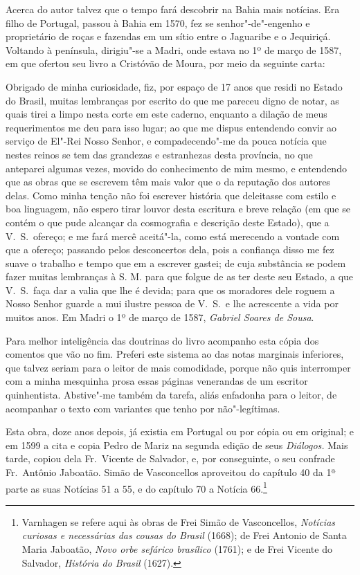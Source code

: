 Acerca do autor talvez que o tempo fará descobrir na Bahia mais 
notícias. Era filho de Portugal, passou à Bahia em 1570, fez 
se senhor"-de"-engenho e proprietário de roças e fazendas em um sítio 
entre o Jaguaribe e o Jequiriçá. Voltando à península, dirigiu"-se a 
Madri, onde estava no 1º de março de 1587, em que ofertou seu livro a 
Cristóvão de Moura, por meio da seguinte carta: 
\begin{hedraquote}
Obrigado de minha curiosidade, fiz, por espaço de 17 anos que 
residi no Estado do Brasil, muitas lembranças por escrito do que me 
pareceu digno de notar, as quais tirei a limpo nesta corte em este 
caderno, enquanto a dilação de meus requerimentos me deu para isso 
lugar; ao que me dispus entendendo convir ao serviço de El"-Rei Nosso 
Senhor, e compadecendo"-me da pouca notícia que nestes reinos se tem 
das grandezas e estranhezas desta província, no que anteparei algumas 
vezes, movido do conhecimento de mim mesmo, e entendendo que as 
obras que se escrevem têm mais valor que o da reputação dos autores 
delas. Como minha tenção não foi escrever história que deleitasse com 
estilo e boa linguagem, não espero tirar louvor desta escritura e breve 
relação (em que se contém o que pude alcançar da cosmografia e 
descrição deste Estado), que a V.~S.~ofereço; e me fará mercê aceitá"-la, 
como está merecendo a vontade com que a ofereço; passando pelos 
desconcertos dela, pois a confiança disso me fez suave o trabalho e 
tempo que em a escrever gastei; de cuja substância se podem fazer 
muitas lembranças à S. M. para que folgue de as ter deste seu Estado, a 
que V.~S.~faça dar a valia que lhe é devida; para que os moradores dele 
roguem a Nosso Senhor guarde a mui ilustre pessoa de V.~S.~e lhe acrescente a 
vida por muitos anos. Em Madri o 1º de março de 1587, \textit{Gabriel Soares de Sousa}. 
\end{hedraquote}

Para melhor inteligência das doutrinas do livro acompanho esta 
cópia dos comentos que vão no fim. Preferi este sistema ao das notas 
marginais inferiores, que talvez seriam para o leitor de mais 
comodidade, porque não quis interromper com a minha mesquinha 
prosa essas páginas venerandas de um escritor quinhentista. Abstive"-me 
também da tarefa, aliás enfadonha para o leitor, de acompanhar o texto 
com variantes que tenho por não"-legítimas. 

Esta obra, doze anos depois, já existia em Portugal ou por cópia ou 
em original; e em 1599 a cita e copia Pedro de Mariz na segunda edição 
de seus \textit{Diálogos.} Mais tarde, copiou dela Fr.~Vicente de Salvador, e, 
por conseguinte, o seu confrade Fr.~Antônio Jaboatão. Simão de 
Vasconcellos aproveitou do capítulo 40 da 1ª parte as suas Notícias 51 a 
55, e do capítulo 70 a Notícia 66.\footnote{ Varnhagen se refere aqui às obras de Frei 
Simão de Vasconcellos, \textit{Notícias curiosas e necessárias das cousas do Brasil} (1668); de 
Frei Antonio de Santa Maria Jaboatão, \textit{ Novo orbe sefárico brasílico} (1761); e de 
Frei Vicente do Salvador, \textit{ História do Brasil} (1627).}  

